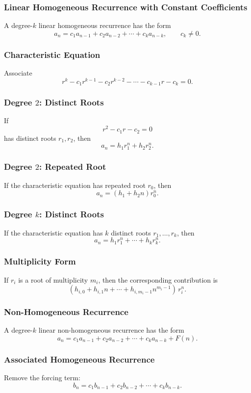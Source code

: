 \documentclass[12pt]{article}
\begin{document}
\subsubsection{Linear Homogeneous Recurrence with Constant Coefficients}
A degree-\(k\) linear homogeneous recurrence has the form
\[
a_n=c_1a_{n-1}+c_2a_{n-2}+\cdots+c_ka_{n-k},
\qquad c_k\ne 0.
\]

\subsubsection{Characteristic Equation}
Associate
\[
r^k-c_1r^{k-1}-c_2r^{k-2}-\cdots-c_{k-1}r-c_k=0.
\]

\subsubsection{Degree \(2\): Distinct Roots}
If
\[
r^2-c_1r-c_2=0
\]
has distinct roots \(r_1,r_2\), then
\[
a_n=h_1r_1^n+h_2r_2^n.
\]

\subsubsection{Degree \(2\): Repeated Root}
If the characteristic equation has repeated root \(r_0\), then
\[
a_n=(h_1+h_2n)r_0^n.
\]

\subsubsection{Degree \(k\): Distinct Roots}
If the characteristic equation has \(k\) distinct roots \(r_1,\dots,r_k\), then
\[
a_n=h_1r_1^n+\cdots+h_kr_k^n.
\]

\subsubsection{Multiplicity Form}
If \(r_i\) is a root of multiplicity \(m_i\), then the corresponding contribution is
\[
(h_{i,0}+h_{i,1}n+\cdots+h_{i,m_i-1}n^{m_i-1})\,r_i^n.
\]

\subsubsection{Non-Homogeneous Recurrence}
A degree-\(k\) linear non-homogeneous recurrence has the form
\[
a_n=c_1a_{n-1}+c_2a_{n-2}+\cdots+c_ka_{n-k}+F(n).
\]

\subsubsection{Associated Homogeneous Recurrence}
Remove the forcing term:
\[
b_n=c_1b_{n-1}+c_2b_{n-2}+\cdots+c_kb_{n-k}.
\]
\end{document}
